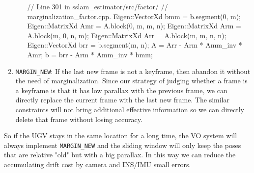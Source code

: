 \documentclass[12pt]{report}   %
\begin{document}
\begin{enumerate}
\begin{enumerate}
\begin{cppcode}
// Line 301 in sslam\_estimator/src/factor/
// marginalization\_factor.cpp. 
Eigen::VectorXd bmm = b.segment(0, m);
Eigen::MatrixXd Amr = A.block(0, m, m, n);
Eigen::MatrixXd Arm = A.block(m, 0, n, m);
Eigen::MatrixXd Arr = A.block(m, m, n, n);
Eigen::VectorXd brr = b.segment(m, n);
A = Arr - Arm * Amm_inv * Amr;
b = brr - Arm * Amm_inv * bmm;
\end{cppcode}
		
	\end{enumerate}
	
	
	\item \verb|MARGIN_NEW|: If the last new frame is not a keyframe, then abandon it without the need of marginalization. Since our strategy of judging whether a frame is a keyframe is that it has low parallax with the previous frame, we can directly replace the current frame with the last new frame. The similar constraints will not bring additional effective information so we can directly delete that frame without losing accuracy. 
	
\end{enumerate}

So if the UGV stays in the same location for a long time, the VO system will always implement \verb|MARGIN_NEW| and the sliding window will only keep the poses that are relative "old" but with a big parallax. In this way we can reduce the accumulating drift cost by camera and INS/IMU small errors.




















\newpage 


\end{document}
